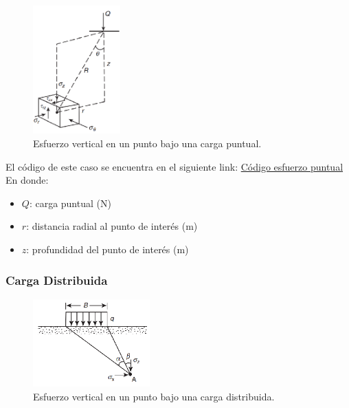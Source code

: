 \documentclass{article} %
\begin{document}
\begin{figure}[h]
    \centering
    \includegraphics[width=0.3\textwidth]{Graficos/Carga_puntual.PNG}
    \caption{Esfuerzo vertical en un punto bajo una carga puntual.}
    \label{fig:incremento_esfuerzo_vertical}
\end{figure}
El código de este caso se encuentra en el siguiente link: \href{https://github.com/berckanala/Fundaciones_P2/blob/main/Codigos/python/esfuerzo_puntual.py}{Código esfuerzo puntual}
En donde:
\begin{itemize}
    \item $Q$: carga puntual (N)
    \item $r$: distancia radial al punto de interés (m)
    \item $z$: profundidad del punto de interés (m)
\end{itemize}

\subsubsection*{Carga Distribuida}
\begin{figure}[h]
    \centering
    \includegraphics[width=0.4\textwidth]{Graficos/Carga_distribuida.PNG}
    \caption{Esfuerzo vertical en un punto bajo una carga distribuida.}
    \label{fig:distibuido_esfuerzo_vertical}
\end{figure}
\end{document}
